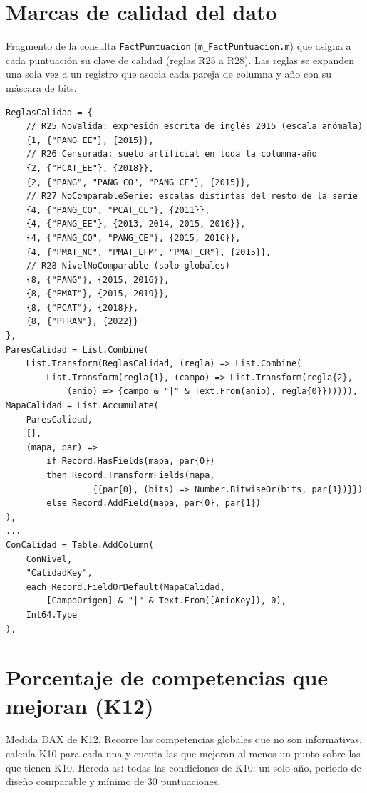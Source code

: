 \documentclass[12pt, a4paper, oneside]{report}
\begin{document}
\section{Marcas de calidad del dato}
Fragmento de la consulta \texttt{FactPuntuacion} (\texttt{m\_FactPuntuacion.m}) que asigna a cada puntuación su clave de calidad (reglas R25 a R28). Las reglas se expanden una sola vez a un registro que asocia cada pareja de columna y año con su máscara de bits.

\begingroup\footnotesize{}
\begin{verbatim}
ReglasCalidad = {
    // R25 NoValida: expresión escrita de inglés 2015 (escala anómala)
    {1, {"PANG_EE"}, {2015}},
    // R26 Censurada: suelo artificial en toda la columna-año
    {2, {"PCAT_EE"}, {2018}},
    {2, {"PANG", "PANG_CO", "PANG_CE"}, {2015}},
    // R27 NoComparableSerie: escalas distintas del resto de la serie
    {4, {"PANG_CO", "PCAT_CL"}, {2011}},
    {4, {"PANG_EE"}, {2013, 2014, 2015, 2016}},
    {4, {"PANG_CO", "PANG_CE"}, {2015, 2016}},
    {4, {"PMAT_NC", "PMAT_EFM", "PMAT_CR"}, {2015}},
    // R28 NivelNoComparable (solo globales)
    {8, {"PANG"}, {2015, 2016}},
    {8, {"PMAT"}, {2015, 2019}},
    {8, {"PCAT"}, {2018}},
    {8, {"PFRAN"}, {2022}}
},
ParesCalidad = List.Combine(
    List.Transform(ReglasCalidad, (regla) => List.Combine(
        List.Transform(regla{1}, (campo) => List.Transform(regla{2},
            (anio) => {campo & "|" & Text.From(anio), regla{0}}))))),
MapaCalidad = List.Accumulate(
    ParesCalidad,
    [],
    (mapa, par) =>
        if Record.HasFields(mapa, par{0})
        then Record.TransformFields(mapa,
                 {{par{0}, (bits) => Number.BitwiseOr(bits, par{1})}})
        else Record.AddField(mapa, par{0}, par{1})
),
...
ConCalidad = Table.AddColumn(
    ConNivel,
    "CalidadKey",
    each Record.FieldOrDefault(MapaCalidad,
        [CampoOrigen] & "|" & Text.From([AnioKey]), 0),
    Int64.Type
),
\end{verbatim}
\endgroup

\section{Porcentaje de competencias que mejoran (K12)}
Medida DAX de K12. Recorre las competencias globales que no son informativas, calcula K10 para cada una y cuenta las que mejoran al menos un punto sobre las que tienen K10. Hereda así todas las condiciones de K10: un solo año, periodo de diseño comparable y mínimo de 30 puntuaciones.
\end{document}
